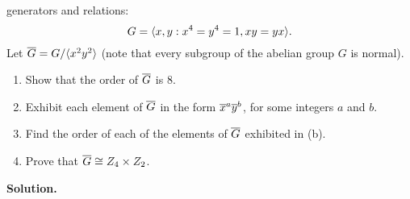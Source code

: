 \begin{enumerate}
                  generators and relations:
                  $$G = \langle x, y : x^4 = y^4 = 1, xy = yx \rangle.$$
                  Let $\overline{G} = G/\langle x^2y^2 \rangle$ (note that every subgroup of the
                  abelian group $G$ is normal).
                  \begin{enumerate}
                     \item Show that the order of $\overline{G}$ is 8.
                     \item Exhibit each element of $\overline{G}$ in the form
                           $\overline{x}^a\overline{y}^b$, for some integers $a$ and $b$.
                     \item Find the order of each of the elements of $\overline{G}$
                           exhibited in (b).
                     \item Prove that $\overline{G} \cong Z_4 \times Z_2$.
                  \end{enumerate}

      \textbf{Solution.}


\end{enumerate}
